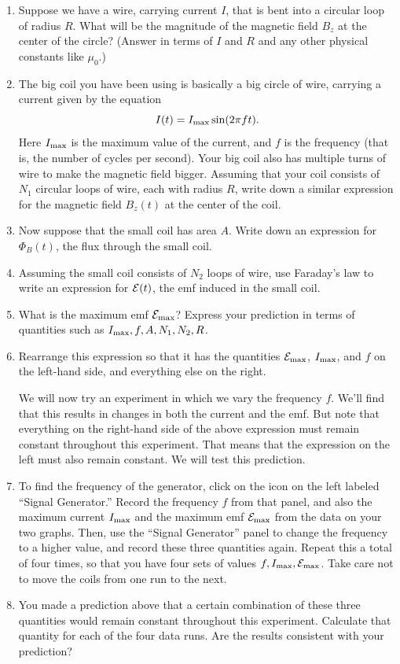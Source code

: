 \begin{enumerate}[labparts]
\item Suppose we have a wire, carrying current $I$, that is bent into a circular loop of radius $R$.  What will be the magnitude of the magnetic field $B_z$ at the center of the circle? (Answer in terms of $I$ and $R$ and any other physical constants like $\mu_0$.)
\answerspace{1.2in}

\item The big coil you have been using is basically a big circle of wire, carrying a current given by the equation
$$
I(t)=I_{\rm max}\sin(2\pi f t).
$$
Here $I_{\rm max}$ is the maximum value of the current, and
$f$ is the frequency (that is, the number of cycles per second).  
Your big coil also has multiple turns of wire to make the magnetic field bigger.
Assuming that your coil consists of $N_1$ circular loops of
wire, each with radius $R$, write down a similar expression for
the magnetic field $B_z(t)$ at the center of the coil.
\answerspace{0.8in}

\item Now suppose that the small coil has area $A$.  Write down an expression for $\Phi_B(t)$, the
flux through the small coil.
\answerspace{0.75in}

\item Assuming the small coil consists of $N_2$ loops of wire, use Faraday's law to write an expression 
for ${\cal E}(t)$, the emf induced in the small coil.
\answerspace{0.75in}

\item What is the maximum emf ${\cal E}_{\rm max}$?  Express your prediction
in terms of quantities such as $I_{\rm max},f,A,N_1,N_2,R$.
\answerspace{0.75in}

\item Rearrange this expression so that it has the quantities ${\cal E}_{\rm max}$,
$I_{\rm max}$, and $f$ on the left-hand side, and everything else on the right.
\answerspace{0.75in}


\pagebreak[3]
We will now try an experiment in which we vary the frequency $f$.  We'll
find that this results in changes in both the current and the emf.
But note that everything on the right-hand side of the above expression
must remain constant throughout this experiment.  That
means that the expression on the left must also remain
constant.  We will test this prediction.

\item  To find the frequency of the generator, click on the icon on the left labeled ``Signal Generator.''  Record the frequency $f$ from that panel, and also the maximum current $I_{\rm max}$ and the
maximum emf ${\cal E}_{\rm max}$ from the data on your two graphs.
Then, use the ``Signal Generator'' panel to change the frequency to a higher value,
and record these three quantities again.  Repeat this a total of four
times, so that you have four sets of values $f, I_{\rm max}, {\cal E}_{\rm max}$.
Take care not to move the coils from one run to the next.
\answerspace{3in}

\item  You made a prediction above that a certain combination of these
three quantities would remain constant throughout this experiment.
Calculate that quantity for each of the four data runs.  Are the
results consistent with your prediction?
\answerspace{3in}
\end{enumerate}

